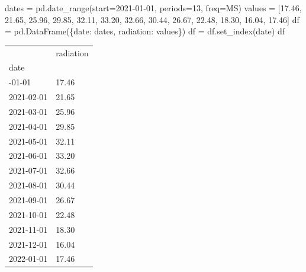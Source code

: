 \documentclass[
  letterpaper,
  DIV=11,
  numbers=noendperiod,
  oneside]{scrreprt}
\newenvironment{Shaded}{\begin{snugshade}}{\end{snugshade}}
\newcommand{\DecValTok}[1]{\textcolor[rgb]{0.68,0.00,0.00}{#1}}
\newcommand{\FloatTok}[1]{\textcolor[rgb]{0.68,0.00,0.00}{#1}}
\newcommand{\NormalTok}[1]{\textcolor[rgb]{0.00,0.23,0.31}{#1}}
\newcommand{\OperatorTok}[1]{\textcolor[rgb]{0.37,0.37,0.37}{#1}}
\newcommand{\StringTok}[1]{\textcolor[rgb]{0.13,0.47,0.30}{#1}}
\begin{document}
\begin{Shaded}
\begin{Highlighting}[]
\NormalTok{dates }\OperatorTok{=}\NormalTok{ pd.date\_range(start}\OperatorTok{=}\StringTok{\textquotesingle{}2021{-}01{-}01\textquotesingle{}}\NormalTok{, periods}\OperatorTok{=}\DecValTok{13}\NormalTok{, freq}\OperatorTok{=}\StringTok{\textquotesingle{}MS\textquotesingle{}}\NormalTok{)}
\NormalTok{values }\OperatorTok{=}\NormalTok{ [}\FloatTok{17.46}\NormalTok{, }\FloatTok{21.65}\NormalTok{, }\FloatTok{25.96}\NormalTok{, }\FloatTok{29.85}\NormalTok{, }\FloatTok{32.11}\NormalTok{, }\FloatTok{33.20}\NormalTok{, }\FloatTok{32.66}\NormalTok{, }\FloatTok{30.44}\NormalTok{, }\FloatTok{26.67}\NormalTok{, }\FloatTok{22.48}\NormalTok{, }\FloatTok{18.30}\NormalTok{, }\FloatTok{16.04}\NormalTok{, }\FloatTok{17.46}\NormalTok{]}
\NormalTok{df }\OperatorTok{=}\NormalTok{ pd.DataFrame(\{}\StringTok{\textquotesingle{}date\textquotesingle{}}\NormalTok{: dates, }\StringTok{\textquotesingle{}radiation\textquotesingle{}}\NormalTok{: values\})}
\NormalTok{df }\OperatorTok{=}\NormalTok{ df.set\_index(}\StringTok{\textquotesingle{}date\textquotesingle{}}\NormalTok{)}
\NormalTok{df}
\end{Highlighting}
\end{Shaded}

\begin{longtable}[]{@{}ll@{}}
\toprule\noalign{}
& radiation \\
date & \\
\midrule\noalign{}
\endhead
\bottomrule\noalign{}
\endlastfoot
2021-01-01 & 17.46 \\
2021-02-01 & 21.65 \\
2021-03-01 & 25.96 \\
2021-04-01 & 29.85 \\
2021-05-01 & 32.11 \\
2021-06-01 & 33.20 \\
2021-07-01 & 32.66 \\
2021-08-01 & 30.44 \\
2021-09-01 & 26.67 \\
2021-10-01 & 22.48 \\
2021-11-01 & 18.30 \\
2021-12-01 & 16.04 \\
2022-01-01 & 17.46 \\
\end{longtable}
\end{document}
